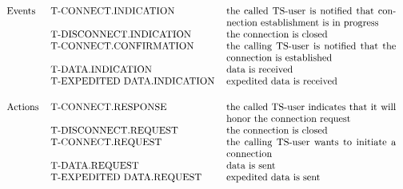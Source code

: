 
\[\begin{tabular}{llp{2.4in}}
Events&	T-CONNECT.INDICATION&	the called TS-user is notified that connection
				establishment is in progress\\
&	T-DISCONNECT.INDICATION&the connection is closed\\
&	T-CONNECT.CONFIRMATION&	the calling TS-user is notified that the
				connection is established\\
&	T-DATA.INDICATION&	data is received\\
&	T-EXPEDITED DATA.INDICATION&
				expedited data is received\\[0.2in]
Actions&T-CONNECT.RESPONSE&	the called TS-user indicates that it will
				honor the connection request\\
&	T-DISCONNECT.REQUEST&	the connection is closed\\
&	T-CONNECT.REQUEST&	the calling TS-user wants to initiate a
				connection\\
&	T-DATA.REQUEST&		data is sent\\
&	T-EXPEDITED DATA.REQUEST&
				expedited data is sent
\end{tabular}\]
